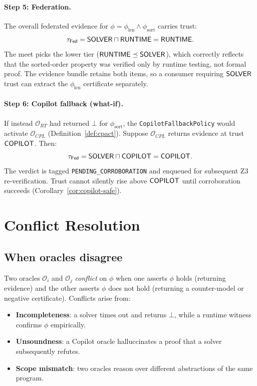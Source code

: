 \documentclass[11pt]{article}
\newcommand{\Oracle}{\mathcal{O}}            %
\newcommand{\Orcl}[1]{\Oracle_{#1}}         %
\newcommand{\tmin}{\sqcap}                   %
\newcommand{\tmeet}[2]{#1 \tmin #2}          %
\newcommand{\Fed}{\mathsf{Fed}}             %
\begin{document}
\paragraph{Step 5: Federation.}
The overall federated evidence for $\phi = \phi_{\mathrm{len}} \wedge
\phi_{\mathrm{sort}}$ carries trust:
\[
  \tau_{\Fed} = \tmeet{\Tsolver}{\Truntime} = \Truntime.
\]
The meet picks the lower tier ($\mathsf{RUNTIME} \preceq \mathsf{SOLVER}$), which
correctly reflects that the sorted-order property was verified only by
runtime testing, not formal proof.  The evidence bundle retains both
items, so a consumer requiring $\mathsf{SOLVER}$ trust can extract the
$\phi_{\mathrm{len}}$ certificate separately.

\paragraph{Step 6: Copilot fallback (what-if).}
If instead $\Orcl{RT}$ had returned $\bot$ for $\phi_{\mathrm{sort}}$,
the \texttt{CopilotFallbackPolicy} would activate $\Orcl{CPL}$
(Definition~\ref{def:cpact}).  Suppose $\Orcl{CPL}$ returns evidence at
trust $\mathsf{COPILOT}$.  Then:
\[
  \tau_{\Fed} = \tmeet{\Tsolver}{\Tcopilot} = \Tcopilot.
\]
The verdict is tagged \texttt{PENDING\_CORROBORATION} and enqueued
for subsequent Z3 re-verification.  Trust cannot silently rise above
$\mathsf{COPILOT}$ until corroboration succeeds
(Corollary~\ref{cor:copilot-safe}).

\section{Conflict Resolution}\label{sec:conflict}

\subsection{When oracles disagree}

Two oracles $\Orcl{i}$ and $\Orcl{j}$ \emph{conflict} on $\phi$ when
one asserts $\phi$ holds (returning evidence) and the other asserts
$\phi$ does not hold (returning a counter-model or negative certificate).
Conflicts arise from:
\begin{itemize}[nosep]
  \item \textbf{Incompleteness}: a solver times out and returns $\bot$,
        while a runtime witness confirms $\phi$ empirically.
  \item \textbf{Unsoundness}: a Copilot oracle halluccinates a proof
        that a solver subsequently refutes.
  \item \textbf{Scope mismatch}: two oracles reason over different
        abstractions of the same program.
\end{itemize}
\end{document}
